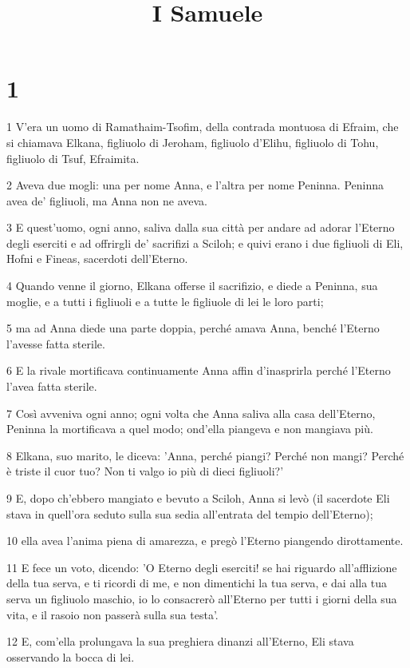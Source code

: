 

\title{I Samuele}


\chapter{1}

\par 1 V'era un uomo di Ramathaim-Tsofim, della contrada montuosa di Efraim, che si chiamava Elkana, figliuolo di Jeroham, figliuolo d'Elihu, figliuolo di Tohu, figliuolo di Tsuf, Efraimita.
\par 2 Aveva due mogli: una per nome Anna, e l'altra per nome Peninna. Peninna avea de' figliuoli, ma Anna non ne aveva.
\par 3 E quest'uomo, ogni anno, saliva dalla sua città per andare ad adorar l'Eterno degli eserciti e ad offrirgli de' sacrifizi a Sciloh; e quivi erano i due figliuoli di Eli, Hofni e Fineas, sacerdoti dell'Eterno.
\par 4 Quando venne il giorno, Elkana offerse il sacrifizio, e diede a Peninna, sua moglie, e a tutti i figliuoli e a tutte le figliuole di lei le loro parti;
\par 5 ma ad Anna diede una parte doppia, perché amava Anna, benché l'Eterno l'avesse fatta sterile.
\par 6 E la rivale mortificava continuamente Anna affin d'inasprirla perché l'Eterno l'avea fatta sterile.
\par 7 Così avveniva ogni anno; ogni volta che Anna saliva alla casa dell'Eterno, Peninna la mortificava a quel modo; ond'ella piangeva e non mangiava più.
\par 8 Elkana, suo marito, le diceva: 'Anna, perché piangi? Perché non mangi? Perché è triste il cuor tuo? Non ti valgo io più di dieci figliuoli?'
\par 9 E, dopo ch'ebbero mangiato e bevuto a Sciloh, Anna si levò (il sacerdote Eli stava in quell'ora seduto sulla sua sedia all'entrata del tempio dell'Eterno);
\par 10 ella avea l'anima piena di amarezza, e pregò l'Eterno piangendo dirottamente.
\par 11 E fece un voto, dicendo: 'O Eterno degli eserciti! se hai riguardo all'afflizione della tua serva, e ti ricordi di me, e non dimentichi la tua serva, e dai alla tua serva un figliuolo maschio, io lo consacrerò all'Eterno per tutti i giorni della sua vita, e il rasoio non passerà sulla sua testa'.
\par 12 E, com'ella prolungava la sua preghiera dinanzi all'Eterno, Eli stava osservando la bocca di lei.
